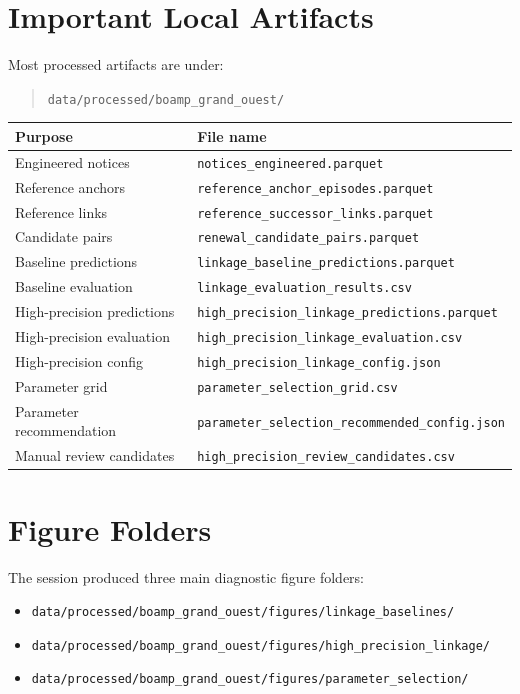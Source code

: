 \documentclass[11pt,a4paper]{article}
\newcommand{\pathcode}[1]{{\small\nolinkurl{#1}}}
\begin{document}
\section*{Important Local Artifacts}

\noindent Most processed artifacts are under:

\begin{quote}
\pathcode{data/processed/boamp_grand_ouest/}
\end{quote}

\small
\begin{longtable}{p{}p{}}
\toprule
Purpose & File name \\
\midrule
\endhead
Engineered notices & \pathcode{notices_engineered.parquet} \\
Reference anchors & \pathcode{reference_anchor_episodes.parquet} \\
Reference links & \pathcode{reference_successor_links.parquet} \\
Candidate pairs & \pathcode{renewal_candidate_pairs.parquet} \\
Baseline predictions & \pathcode{linkage_baseline_predictions.parquet} \\
Baseline evaluation & \pathcode{linkage_evaluation_results.csv} \\
High-precision predictions & \pathcode{high_precision_linkage_predictions.parquet} \\
High-precision evaluation & \pathcode{high_precision_linkage_evaluation.csv} \\
High-precision config & \pathcode{high_precision_linkage_config.json} \\
Parameter grid & \pathcode{parameter_selection_grid.csv} \\
Parameter recommendation & \pathcode{parameter_selection_recommended_config.json} \\
Manual review candidates & \pathcode{high_precision_review_candidates.csv} \\
\bottomrule
\end{longtable}
\normalsize

\section*{Figure Folders}

The session produced three main diagnostic figure folders:

\begin{itemize}
  \item \pathcode{data/processed/boamp_grand_ouest/figures/linkage_baselines/}
  \item \pathcode{data/processed/boamp_grand_ouest/figures/high_precision_linkage/}
  \item \pathcode{data/processed/boamp_grand_ouest/figures/parameter_selection/}
\end{itemize}
\end{document}
